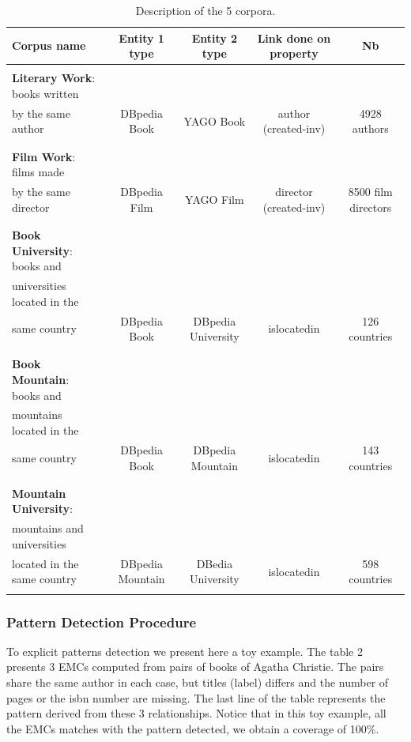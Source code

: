 \documentclass[runningheads]{llncs}
\begin{document}
\begin{table}[]
    \centering
    \begin{tabular}{lcccc}
    \hline
    Corpus name & Entity 1 type & Entity 2 type & Link done on property & Nb   \\
    \hline
    &&&& \\
      \textbf{Literary Work}: books written  & & & & \\
      by the same author  & DBpedia Book & YAGO Book & author (created-inv) & 4928 authors\\
      & & & & \\
      \hline
      &&&& \\
      \textbf{Film Work}: films made  & & & & \\ 
      by the same director & DBpedia Film & YAGO Film & director (created-inv) & 8500 film directors \\
      & & & & \\
    \hline
    \hline
    &&&& \\
     \textbf{Book University}: books and & & & & \\ 
     universities located in the & & & & \\
     same country & DBpedia Book & DBpedia University & islocatedin & 126 countries \\
     & & & & \\
     \hline
     &&&& \\
     \textbf{Book Mountain}: books and &&&& \\
     mountains located in the &&&& \\
     same country& DBpedia Book & DBpedia Mountain & islocatedin & 143 countries\\
     & & & & \\
     \hline
     &&&& \\
     \textbf{Mountain University}: &&&& \\
     mountains and universities  &&&& \\
     located in the same country& DBpedia Mountain & DBedia University & islocatedin & 598 countries \\
     & & & & \\
     \hline
    \end{tabular}
    \caption{Description of the 5 corpora.}
    \label{tab:corpus-construction}
\end{table}

\subsubsection{Pattern Detection Procedure}
To explicit patterns detection we present here a toy example. The table 2 presents 3 EMCs computed from pairs of books of Agatha Christie. The pairs share the same author in each case, but titles (label) differs and the number of pages or the isbn number are missing.  The last line of the table represents the pattern derived from these 3 relationships. Notice that in this toy example, all the EMCs matches with the pattern detected, we obtain a coverage of 100\%. 
\end{document}

